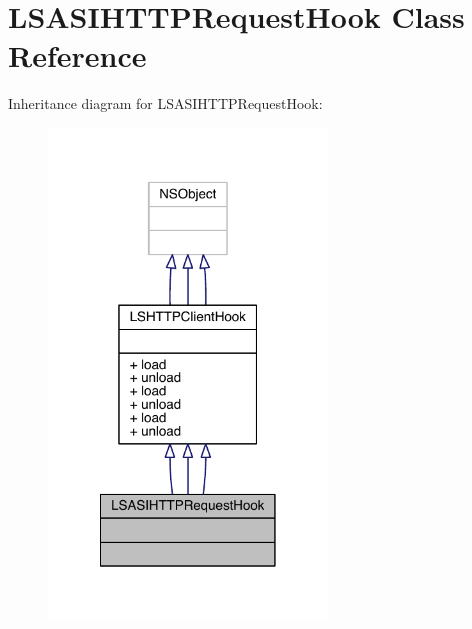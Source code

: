 \hypertarget{interface_l_s_a_s_i_h_t_t_p_request_hook}{\section{L\-S\-A\-S\-I\-H\-T\-T\-P\-Request\-Hook Class Reference}
\label{interface_l_s_a_s_i_h_t_t_p_request_hook}
}


Inheritance diagram for L\-S\-A\-S\-I\-H\-T\-T\-P\-Request\-Hook\-:\nopagebreak
\begin{figure}[H]
\begin{center}
\leavevmode
\includegraphics[width=210pt]{interface_l_s_a_s_i_h_t_t_p_request_hook__inherit__graph}
\end{center}
\end{figure}


